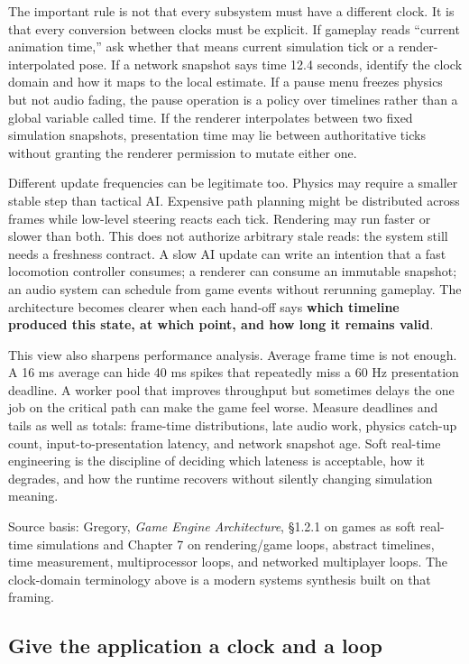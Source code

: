 The important rule is not that every subsystem must have a different clock. It is that every conversion between clocks must be explicit. If gameplay reads ``current animation time,'' ask whether that means current simulation tick or a render-interpolated pose. If a network snapshot says time 12.4 seconds, identify the clock domain and how it maps to the local estimate. If a pause menu freezes physics but not audio fading, the pause operation is a policy over timelines rather than a global variable called time. If the renderer interpolates between two fixed simulation snapshots, presentation time may lie between authoritative ticks without granting the renderer permission to mutate either one.

Different update frequencies can be legitimate too. Physics may require a smaller stable step than tactical AI. Expensive path planning might be distributed across frames while low-level steering reacts each tick. Rendering may run faster or slower than both. This does not authorize arbitrary stale reads: the system still needs a freshness contract. A slow AI update can write an intention that a fast locomotion controller consumes; a renderer can consume an immutable snapshot; an audio system can schedule from game events without rerunning gameplay. The architecture becomes clearer when each hand-off says \textbf{which timeline produced this state, at which point, and how long it remains valid}.

This view also sharpens performance analysis. Average frame time is not enough. A 16 ms average can hide 40 ms spikes that repeatedly miss a 60 Hz presentation deadline. A worker pool that improves throughput but sometimes delays the one job on the critical path can make the game feel worse. Measure deadlines and tails as well as totals: frame-time distributions, late audio work, physics catch-up count, input-to-presentation latency, and network snapshot age. Soft real-time engineering is the discipline of deciding which lateness is acceptable, how it degrades, and how the runtime recovers without silently changing simulation meaning.

Source basis: Gregory, \emph{Game Engine Architecture}, §1.2.1 on games as soft real-time simulations and Chapter 7 on rendering/game loops, abstract timelines, time measurement, multiprocessor loops, and networked multiplayer loops. The clock-domain terminology above is a modern systems synthesis built on that framing.

\subsection{Give the application a clock and a loop}\label{05-engine-i-ch013-give-the-application-a-clock-and-a-loop}

